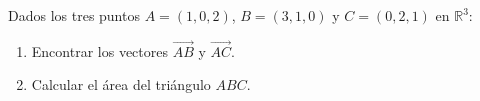 Dados los tres puntos $A = (1, 0, 2)$, $B = (3, 1, 0)$ y $C = (0, 2, 1)$ en $\mathbb{R}^3$:
\begin{enumerate}
    \item Encontrar los vectores $\overrightarrow{AB}$ y $\overrightarrow{AC}$.
    \item Calcular el área del triángulo $ABC$.
\end{enumerate}